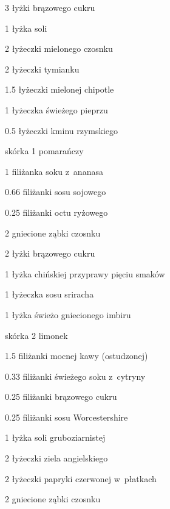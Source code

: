 \documentclass[../main.tex]{subfiles}
\begin{document}

\begin{Ingred}
    \item \num{3} łyżki brązowego cukru
    \item \num{1} łyżka soli
    \item \num{2} łyżeczki mielonego czosnku
    \item \num{2} łyżeczki tymianku
    \item \num{1.5} łyżeczki mielonej chipotle
    \item \num{1} łyżeczka świeżego pieprzu
    \item \num{.5} łyżeczki kminu rzymskiego
    \item skórka \num{1} pomarańczy
\end{Ingred}


\begin{Ingred}
    \item \num{1} filiżanka soku z~ananasa
    \item \num{.66} filiżanki sosu sojowego
    \item \num{.25} filiżanki octu ryżowego
    \item \num{2} gniecione ząbki czosnku
    \item \num{2} łyżki brązowego cukru
    \item \num{1} łyżka chińskiej przyprawy pięciu smaków
    \item \num{1} łyżeczka sosu sriracha
    \item \num{1} łyżka świeżo gniecionego imbiru
    \item skórka \num{2} limonek
\end{Ingred}


\begin{Ingred}
    \item \num{1.5} filiżanki mocnej kawy (ostudzonej)
    \item \num{.33} filiżanki świeżego soku z~cytryny
    \item \num{.25} filiżanki brązowego cukru
    \item \num{.25} filiżanki sosu Worcestershire
    \item \num{1} łyżka soli gruboziarnistej
    \item \num{2} łyżeczki ziela angielskiego
    \item \num{2} łyżeczki papryki czerwonej w~płatkach
    \item \num{2} gniecione ząbki czosnku
\end{Ingred}
\end{document}
